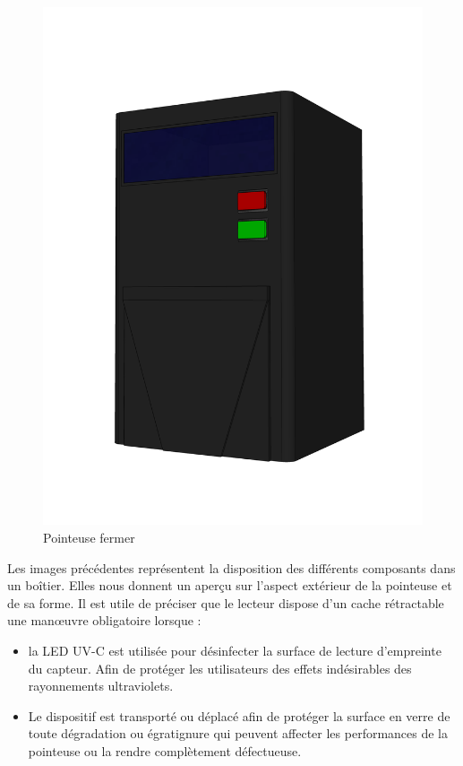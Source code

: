 \begin{figure}[!htb]
\begin{minipage}{0.5\textwidth}
         \includegraphics[scale=0.16]{images/prototype/4.png}
         \vspace{-40pt}
         \caption{Pointeuse fermer}\label{ }
       \end{minipage}
    \end{figure}


Les images précédentes représentent la disposition des différents composants 
dans un boîtier. Elles nous donnent un aperçu sur l’aspect extérieur de la 
pointeuse et de sa forme. Il est utile de préciser que le lecteur dispose d’un 
cache rétractable une manœuvre obligatoire lorsque :

    \begin{itemize}
        \item [\textbullet] la LED UV-C est utilisée pour désinfecter la surface de 
            lecture d’empreinte du capteur. Afin de protéger les utilisateurs des effets 
            indésirables des rayonnements ultraviolets.
        \item [\textbullet]  Le dispositif est transporté ou déplacé afin de protéger la 
            surface en verre de toute dégradation ou égratignure qui peuvent affecter les 
            performances de la pointeuse ou la rendre complètement défectueuse.  
    \end{itemize}
    
